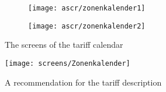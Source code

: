 \begin{figure}[h]
	\centering
	\begin{subfigure}[b]{0.3\columnwidth}
		\centering
		\texttt{[image: ascr/zonenkalender1]}
		\label{fig:zonenkalender1}
	\end{subfigure}
	\begin{subfigure}[b]{0.3\columnwidth}
		\centering
		\texttt{[image: ascr/zonenkalender2]}
		\label{fig:zonenkalender1}
	\end{subfigure}
	\caption{The screens of the tariff calendar}
	\label{fig:equipmentcontrol} %
\end{figure}

\begin{figure}[h]
	\centering
	\texttt{[image: screens/Zonenkalender]}
	\caption{A recommendation for the tariff description }
	\label{fig:kalender} %
\end{figure}

